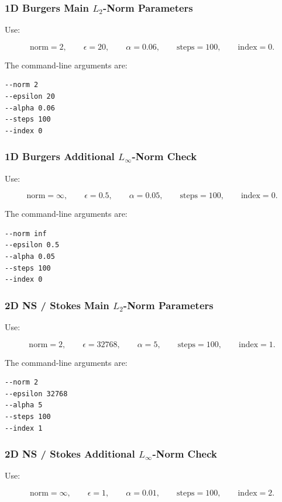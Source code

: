\documentclass{article}
\begin{document}
\subsubsection{1D Burgers Main \(L_2\)-Norm Parameters}

Use:

\[
\text{norm}=2,
\qquad
\epsilon=20,
\qquad
\alpha=0.06,
\qquad
\text{steps}=100,
\qquad
\text{index}=0.
\]

The command-line arguments are:

\begin{verbatim}
--norm 2
--epsilon 20
--alpha 0.06
--steps 100
--index 0
\end{verbatim}

\subsubsection{1D Burgers Additional \(L_\infty\)-Norm Check}

Use:

\[
\text{norm}=\infty,
\qquad
\epsilon=0.5,
\qquad
\alpha=0.05,
\qquad
\text{steps}=100,
\qquad
\text{index}=0.
\]

The command-line arguments are:

\begin{verbatim}
--norm inf
--epsilon 0.5
--alpha 0.05
--steps 100
--index 0
\end{verbatim}

\subsubsection{2D NS / Stokes Main \(L_2\)-Norm Parameters}

Use:

\[
\text{norm}=2,
\qquad
\epsilon=32768,
\qquad
\alpha=5,
\qquad
\text{steps}=100,
\qquad
\text{index}=1.
\]

The command-line arguments are:

\begin{verbatim}
--norm 2
--epsilon 32768
--alpha 5
--steps 100
--index 1
\end{verbatim}

\subsubsection{2D NS / Stokes Additional \(L_\infty\)-Norm Check}

Use:

\[
\text{norm}=\infty,
\qquad
\epsilon=1,
\qquad
\alpha=0.01,
\qquad
\text{steps}=100,
\qquad
\text{index}=2.
\]
\end{document}
